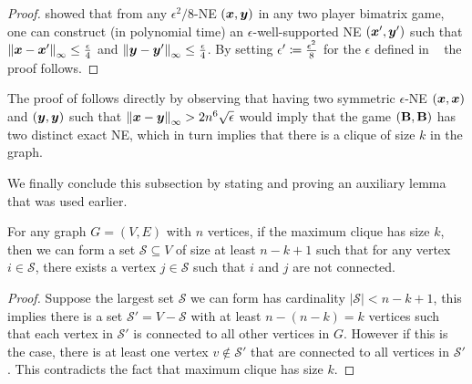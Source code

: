 \begin{proof}
    \citet[Lemma 3.2]{Chen09:Settling} showed that from any $\epsilon^2/8$-NE $({\bm{x}}, {\bm{y}})$ in any two player bimatrix game, one can construct (in polynomial time) an $\epsilon$-well-supported NE $({\bm{x}}', {\bm{y}}')$ such that $\left\| {\bm{x}} - {\bm{x}}' \right\|_{\infty} \leq \frac{\epsilon}{4}$ and $\left\| {\bm{y}} - {\bm{y}}' \right\|_{\infty} \leq \frac{\epsilon}{4}$. By setting $\epsilon' \coloneqq \frac{\epsilon^2}{8}$ for the $\epsilon$ defined in ~ the proof follows.
\end{proof}

The proof of  follows directly by observing that having two symmetric $\epsilon$-NE $({\bm{x}}, {\bm{x}})$ and $({\bm{y}}, {\bm{y}})$ such that $\left\| {\bm{x}} - {\bm{y}} \right\|_{\infty} > 2n^6 \sqrt{\epsilon}$ would imply that the game $(\mathbf{B}, \mathbf{B})$ has two distinct exact NE, which in turn implies that there is a clique of size $k$ in the graph.

We finally conclude this subsection by stating and proving an auxiliary lemma that was used earlier.

\begin{lemma} \label{lemma:not_connected_set}
    For any graph $G = (V, E)$ with $n$ vertices, if the maximum clique has size $k$, then we can form a set $\mathcal{S} \subseteq V$ of size at least $n - k + 1$ such that for any vertex $i \in \mathcal{S}$, there exists a vertex $j \in \mathcal{S}$ such that $i$ and $j$ are not connected.
\end{lemma}

\begin{proof}
    Suppose the largest set $\mathcal{S}$ we can form has cardinality $|\mathcal{S}| < n - k + 1$, this implies there is a set $\mathcal{S}' = V - \mathcal{S}$ with at least $n - (n - k ) = k$ vertices such that each vertex in $\mathcal{S'}$ is connected to all other vertices in $G$. However if this is the case, there is at least one vertex $v \not \in \mathcal{S'}$ that are connected to all vertices in $\mathcal{S'}$. This contradicts the fact that maximum clique has size $k$.
\end{proof}

